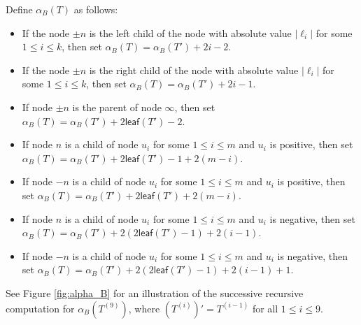 \documentclass[12pt]{article}
\numberwithin{equation}{section}
\theoremstyle{plain}
\def\leaf{\mathsf{leaf}}
\begin{document}
	 Define $\alpha_B(T)$ as follows:
	 	\begin{itemize}
	 		
	 		\item  If  the node  $\pm n$ is the left  child  of the  node  with absolute value $|\ell_i|$ for some $1\leq i\leq k$,  then set $\alpha_B(T)=\alpha_B(T')+2i-2$.
	 		
	 		\item If  the node $\pm n$ is the right  child  of the  node  with absolute value $|\ell_i|$ for some $1\leq i\leq k$,   then set $\alpha_B(T)=\alpha_B(T')+2i-1$.
	 		
	 		\item If  node  $\pm n$ is the parent of  node  $\infty$, then set $\alpha_B(T)=\alpha_B(T')+ 2\leaf(T')-2$.
	 	    
	 	    \item If   node $n$ is  a child of  node $u_i$ for some $1\leq i\leq m$ and   $u_i$ is positive, then set $\alpha_B(T)=\alpha_B(T')+2\leaf(T')-1+2(m-i)$.
	 		
	 		\item If node  $-n$ is  a child of  node   $u_i$ for some $1\leq i\leq m$ and   $u_i$ is positive, then set $\alpha_B(T)=\alpha_B(T')+ 2\leaf(T')+2(m-i)$.
	 		
	 		\item If   node $n$ is  a child of   node $u_i$ for some $1\leq i\leq m$ and  $u_i$ is negative, then set $\alpha_B(T)=\alpha_B(T')+2(2\leaf(T')-1)+2(i-1)$.
	 	    
	 	    \item If    node $-n$ is  a child of  node  $u_i$ for some $1\leq i\leq m$ and $u_i$ is negative,  then set $\alpha_B(T)=\alpha_B(T')+2(2\leaf(T')-1)+2(i-1)+1$.
	 		
	 	\end{itemize}
	 See Figure \ref{fig:alpha_B} for an illustration of the successive recursive computation for $\alpha_B(T^{(9)})$, where $(T^{(i)})'=T^{(i-1)}$ for all $1\leq i\leq 9$.
	 	
	
	
\end{document}
